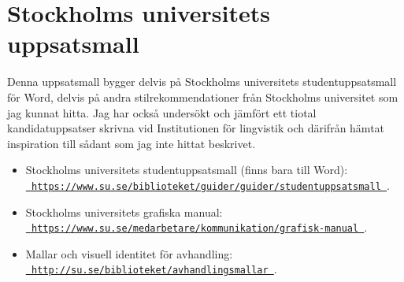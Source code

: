 
\section{Stockholms universitets uppsatsmall}
\label{utseende}

Denna uppsatsmall bygger delvis på Stockholms universitets studentuppsatsmall
för Word, delvis på andra stilrekommendationer från Stockholms universitet som
jag kunnat hitta. Jag har också undersökt och jämfört ett tiotal
kandidatuppsatser skrivna vid Institutionen för lingvistik och därifrån hämtat
inspiration till sådant som jag inte hittat beskrivet.

\medskip

\begin{itemize}
\raggedright%
\item Stockholms universitets studentuppsatsmall (finns bara till Word):
  \\\href{%
    https://www.su.se/biblioteket/guider/guider/studentuppsatsmall%
  }{\texttt{%
      https://\linebreak[0]www.su.se/\linebreak[0]biblioteket/\linebreak[0]%
      guider/\linebreak[0]guider/\linebreak[0]studentuppsatsmall%
  }}.

\item Stockholms universitets grafiska manual:
  \\\href{%
    https://www.su.se/medarbetare/kommunikation/grafisk-manual%
  }{\texttt{%
      https://\linebreak[0]www.su.se/\linebreak[0]medarbetare/\linebreak[0]%
      kommunikation/\linebreak[0]grafisk-manual%
  }}.

\item Mallar och visuell identitet för avhandling:
  \\\href{%
    http://su.se/biblioteket/avhandlingsmallar%
  }{\texttt{%
      http://\linebreak[0]su.se/\linebreak[0]biblioteket/\linebreak[0]%
      avhandlingsmallar%
  }}.


\end{itemize}
